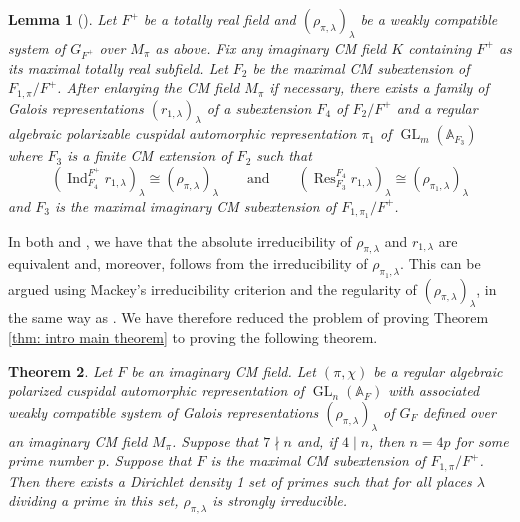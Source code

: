 \documentclass{amsart}
\newtheorem{theorem}{Theorem}[section]
\newtheorem{lemma}[theorem]{Lemma}
\theoremstyle{definition}
\numberwithin{equation}{section} %
\newcommand{\GL}{\operatorname{GL}}
\newcommand{\Ind}{\operatorname{Ind}}
\newcommand{\Res}{\operatorname{Res}}
\newcommand{\bb}[1]{\mathbb{#1}}
\begin{document}
\begin{lemma}[{\cite[Proposition 4.14]{Hui23}}]\label{lemma: work with pi_1 totally real}
    Let \( F^+ \) be a totally real field and \( (\rho_{\pi,\lambda})_\lambda \) be a weakly compatible system of \(G_{F^+} \) over \( M_\pi \) as above. Fix any imaginary CM field \( K \) containing \( F^+ \) as its maximal totally real subfield. Let \( F_2 \) be the maximal CM subextension of \( F_{1,\pi}/F^+ \). After enlarging the CM field \( M_\pi \) if necessary, there exists a family of Galois representations \( (r_{1,\lambda})_\lambda \) of a subextension \( F_4 \) of \( F_2/F^+ \) and a regular algebraic polarizable cuspidal automorphic representation \( \pi_1 \) of \( \GL_m(\bb{A}_{F_3}) \) where \( F_3 \) is a finite CM extension of \( F_2 \) such that
    \[ (\Ind_{F_4}^{F^+} r_{1,\lambda})_\lambda \cong (\rho_{\pi,\lambda})_\lambda \qquad\text{and}\qquad (\Res^{F_4}_{F_3} r_{1,\lambda})_\lambda \cong (\rho_{\pi_1,\lambda})_\lambda \]
    and \( F_3 \) is the maximal imaginary CM subextension of \( F_{1,\pi_1}/F^+ \).
\end{lemma}

In both  and , we have that the absolute irreducibility of \( \rho_{\pi,\lambda} \) and \( r_{1,\lambda} \) are equivalent and, moreover, follows from the irreducibility of \( \rho_{\pi_1,\lambda} \). This can be argued using Mackey’s irreducibility criterion and the regularity of \( (\rho_{\pi,\lambda})_\lambda \), in the same way as \cite[\S 4.3]{Hui23}.
We have therefore reduced the problem of proving Theorem \ref{thm: intro main theorem} to proving the following theorem.

\begin{theorem}\label{theorem: xia's reduction}
    Let \( F \) be an imaginary CM field. Let \( (\pi,\chi) \) be a regular algebraic polarized cuspidal automorphic representation of \( \GL_n(\bb{A}_F) \) with associated weakly compatible system of Galois representations \( (\rho_{\pi,\lambda})_\lambda \) of \( G_F \) defined over an imaginary CM field \( M_\pi \).
    Suppose that \( 7\nmid n \) and, if \( 4\mid n \), then $n = 4p$ for some prime number $p$.
    Suppose that \( F \) is the maximal CM subextension of \( F_{1,\pi}/F^+ \). Then there exists a Dirichlet density 1 set of primes such that for all places \( \lambda \) dividing a prime in this set, \( \rho_{\pi,\lambda} \) is strongly irreducible.
\end{theorem}
\end{document}

